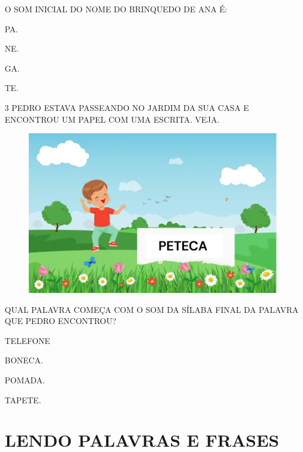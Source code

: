 O SOM INICIAL DO NOME DO BRINQUEDO DE ANA É:

\begin{escolha}
\item PA.

\item NE.

\item GA.

\item TE.
\end{escolha}


\num{3} PEDRO ESTAVA PASSEANDO NO JARDIM DA SUA CASA E ENCONTROU UM PAPEL COM UMA ESCRITA. VEJA.

\begin{figure}[htpb!]
\centering
\includegraphics[width=.8\textwidth]{media/image84.png}
\end{figure}


QUAL PALAVRA COMEÇA COM O SOM DA SÍLABA FINAL DA PALAVRA QUE PEDRO ENCONTROU?

\begin{escolha}
\item TELEFONE

\item BONECA.

\item POMADA.

\item TAPETE.
\end{escolha}

\chapter{LENDO PALAVRAS E FRASES}

